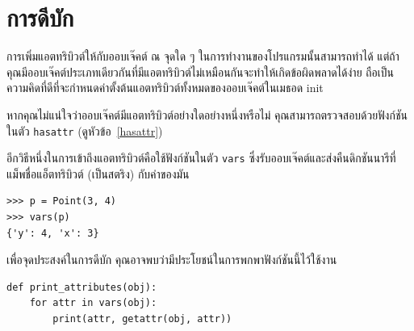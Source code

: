 \section{การดีบัก}


การเพิ่มแอตทริบิวต์ให้กับออบเจ๊คต์ ณ จุดใด ๆ ในการทำงานของโปรแกรมนั้นสามารถทำได้ แต่ถ้าคุณมีออบเจ๊คต์ประเภทเดียวกันที่มีแอตทริบิวต์ไม่เหมือนกันจะทำให้เกิดข้อผิดพลาดได้ง่าย
ถือเป็นความคิดที่ดีที่จะกำหนดค่าตั้งต้นแอตทริบิวต์ทั้งหมดของออบเจ๊คต์ในเมธอด init


หากคุณไม่แน่ใจว่าออบเจ๊คต์มีแอตทริบิวต์อย่างใดอย่างหนึ่งหรือไม่ คุณสามารถตรวจสอบด้วยฟังก์ชันในตัว {\tt hasattr} (ดูหัวข้อ~\ref{hasattr})


อีกวิธีหนึ่งในการเข้าถึงแอตทริบิวต์คือใช้ฟังก์ชันในตัว {\tt vars} ซึ่งรับออบเจ๊คต์และส่งคืนดิกชันนารีที่แม็พชื่อแอ็ตทริบิวต์ (เป็นสตริง) กับค่าของมัน

\begin{verbatim}
>>> p = Point(3, 4)
>>> vars(p)
{'y': 4, 'x': 3}
\end{verbatim}
%

เพื่อจุดประสงค์ในการดีบัก คุณอาจพบว่ามีประโยชน์ในการพกพาฟังก์ชันนี้ไว้ใช้งาน

\begin{verbatim}
def print_attributes(obj):
    for attr in vars(obj):
        print(attr, getattr(obj, attr))
\end{verbatim}
%

